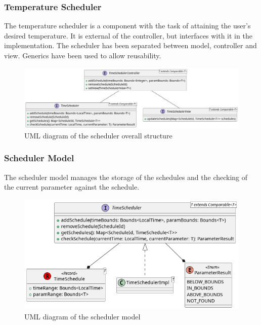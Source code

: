 \subsubsection{Temperature Scheduler}

The temperature scheduler is a component with the task of attaining the user's desired temperature. \newline
It is external of the controller, but interfaces with it in the implementation. \newline
The scheduler has been separated between model, controller and view.
Generics have been used to allow reusability.

\begin{figure}[H]
\centering{}
\includegraphics[width=\textwidth,height=\textheight,keepaspectratio]{magnani/uml/scheduler.png}
\caption{UML diagram of the scheduler overall structure}
\label{magnani:uml:scheduler}
\end{figure}

\subsubsection{Scheduler Model}

The scheduler model manages the storage of the schedules and the checking of the current parameter against the schedule.

\begin{figure}[H]
\centering{}
\includegraphics[width=\textwidth,height=\textheight,keepaspectratio]{magnani/uml/scheduler-model.png}
\caption{UML diagram of the scheduler model}
\label{magnani:uml:scheduler-model}
\end{figure}


